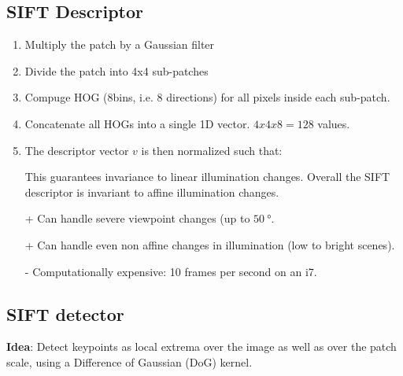 \documentclass[10pt,a4paper]{scrartcl}
\begin{document}
\begin{multicols*}{2}
\begin{enumerate}
\begin{enumerate}
\end{enumerate}

\end{enumerate}

\subsection{SIFT Descriptor}

\begin{enumerate}
\item Multiply the patch by a Gaussian filter
\item Divide the patch into 4x4 sub-patches
\item Compuge HOG (8bins, i.e. 8 directions) for all pixels inside each sub-patch.
\item Concatenate all HOGs into a single 1D vector. $4x4x8=128$ values.
\item The descriptor vector $v$ is then normalized such that:

This guarantees invariance to linear illumination changes. Overall the SIFT descriptor is invariant to affine illumination changes.
\end{enumerate}

\begin{itemize}
\item [+] Can handle severe viewpoint changes (up to $\SI{50}{\degree}$.
\item [+] Can handle even non affine changes in illumination (low to bright scenes).
\item [-] Computationally expensive: 10 frames per second on an i7.
\end{itemize}

\subsection{SIFT detector}

\textbf{Idea}: Detect keypoints as local extrema over the image as well as over the patch scale, using a Difference of Gaussian (DoG) kernel.


\end{multicols*}
\end{document}
